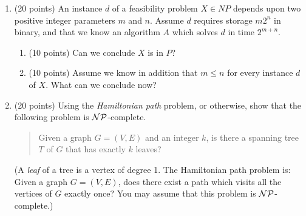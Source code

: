 \documentclass[12pt]{article}
\begin{document}
\begin{enumerate}
  \item (20 points)
         An instance $d$ of a feasibility problem $X \in NP$
         depends upon two positive integer parameters $m$ and $n$.
         Assume $d$ requires storage $m2^n$ in binary, and that we
         know an algorithm $A$ which solves $d$ in time $2^{m+n}$.
         \begin{enumerate}
           \item (10 points) Can we conclude $X$ is in $P$?
           \item (10 points) Assume we know in addition that $m\leq n$ for every
             instance $d$ of $X$.  What can we conclude now?
         \end{enumerate}
  \newpage
  \setcounter{page}{1}  \quad \vspace*{\fill}  \quad
  \newpage
\item (20 points)
   Using the {\em Hamiltonian path} problem, or otherwise,
           show that the following
           problem is ${\cal N}{\cal P}$-complete.
           \begin{quote}
              Given a graph $G=(V,E)$ and an integer $k$, is there a
              spanning tree $T$ of $G$ that has exactly $k$ leaves?
           \end{quote}
           (A {\em leaf} of a tree is a vertex of degree 1.
           The Hamiltonian path problem is: Given a graph $G=(V,E)$, does there
           exist a path which visits all the vertices of $G$ exactly once?
           You may assume that this problem is
           \begin{math}{\cal N}{\cal P}\end{math}-complete.)

\end{enumerate}
\end{document}
